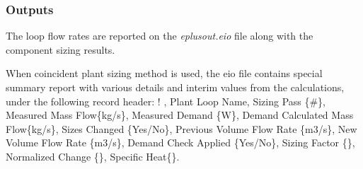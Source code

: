 \subsubsection{Outputs}\label{outputs-3-004}

The loop flow rates are reported on the \emph{eplusout.eio} file along with the component sizing results.

When coincident plant sizing method is used, the eio file contains special summary report with various details and interim values from the calculations, under the following record header: ! , Plant Loop Name, Sizing Pass \{\#\}, Measured Mass Flow\{kg/s\}, Measured Demand \{W\}, Demand Calculated Mass Flow\{kg/s\}, Sizes Changed \{Yes/No\}, Previous Volume Flow Rate \{m3/s\}, New Volume Flow Rate \{m3/s\}, Demand Check Applied \{Yes/No\}, Sizing Factor \{\}, Normalized Change \{\}, Specific Heat\{\}.
